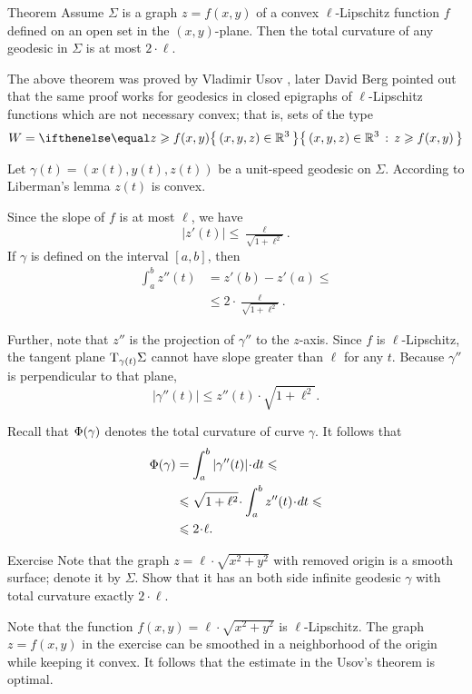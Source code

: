 \begin{thm}{Theorem}\label{thm:usov}
Assume $\Sigma$ is a graph $z=f(x,y)$ of a convex $\ell$-Lipschitz function $f$ defined on an open set in the $(x,y)$-plane.
Then the total curvature of any geodesic in $\Sigma$ is at most $2\cdot \ell$.
\end{thm}

The above theorem was proved by Vladimir Usov \cite{usov},
later David Berg \cite{berg} pointed out that the same proof works for geodesics in closed epigraphs of $\ell$-Lipschitz functions which are not necessary convex; that is, sets of the type 
\[W=\set{(x,y,z)\in\RR^3}{z\ge f(x,y)}\]

Let $\gamma(t)=(x(t),y(t),z(t))$ be a unit-speed geodesic on $\Sigma$.
According to Liberman's lemma 
$z(t)$ is convex.

Since the slope of $f$ is at most $\ell$, we have
\[|z'(t)|\le \tfrac{\ell}{\sqrt{1+\ell^2}}.\]
If $\gamma$ is defined on the interval $[a,b]$, then
\begin{align*}
\int_a^b z''(t)&=z'(b)-z'(a)\le 
\\
&\le 2\cdot \tfrac{\ell}{\sqrt{1+\ell^2}}.
\end{align*}

Further, note that $z''$ is the projection of $\gamma''$ to the $z$-axis.
Since $f$ is $\ell$-Lipschitz, the tangent plane $\mathrm{T}_{\gamma (t)} \Sigma$ cannot have slope greater than $\ell$ for any $t$.
Because $\gamma ''$ is perpendicular to that plane, 
\[|\gamma'' (t)|  \le  z''(t)\cdot\sqrt{1+ \ell ^2}.\]

Recall that $\Phi({\gamma})$ denotes the total curvature of curve $\gamma$.
It follows that 
\begin{align*}
\tc\gamma&=\int_a^b|\gamma'' (t)|\cdot dt\le 
\\
&\le \sqrt{1+ \ell ^2}\cdot  \int_a^b z''(t)\cdot dt\le 
\\
&\le 2\cdot \ell.
\end{align*}
\qedsf

\begin{thm}{Exercise}\label{ex:usov-exact}
Note that the graph $z=\ell\cdot\sqrt{x^2+y^2}$ with removed origin is a smooth surface; denote it by $\Sigma$.
Show that it has an both side infinite geodesic $\gamma$ with total curvature exactly $2\cdot \ell$.
\end{thm}

Note that the function $f(x,y)=\ell\cdot\sqrt{x^2+y^2}$ is $\ell$-Lipschitz.
The graph $z=f(x,y)$ in the exercise can be smoothed in a neighborhood of the origin while keeping it convex.
It follows that the estimate in the Usov's theorem is optimal.


